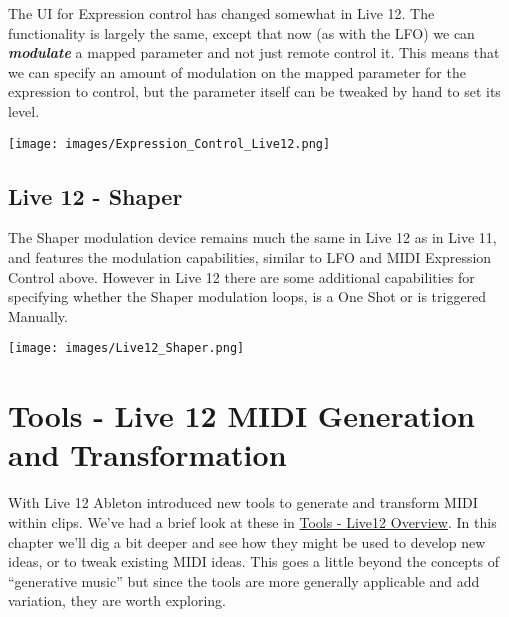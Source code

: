 \documentclass[
  12pt,
  letterpaper,
  oneside,
  open=any]{scrbook}
\begin{document}
The UI for Expression control has changed somewhat in Live 12. The
functionality is largely the same, except that now (as with the LFO) we
can \textbf{\emph{modulate}} a mapped parameter and not just remote
control it. This means that we can specify an amount of modulation on
the mapped parameter for the expression to control, but the parameter
itself can be tweaked by hand to set its level.

\texttt{[image: images/Expression\_Control\_Live12.png]}

\section{Live 12 - Shaper}\label{live-12---shaper}

The Shaper modulation device remains much the same in Live 12 as in Live
11, and features the modulation capabilities, similar to LFO and MIDI
Expression Control above. However in Live 12 there are some additional
capabilities for specifying whether the Shaper modulation loops, is a
One Shot or is triggered Manually.

\texttt{[image: images/Live12\_Shaper.png]}


\chapter{Tools - Live 12 MIDI Generation and
Transformation}\label{Chapter-033-Tools-Live12_MIDI_Generation_Transformation}

With Live 12 Ableton introduced new tools to generate and transform MIDI
within clips. We've had a brief look at these in
\hyperref[Chapter-030-Tools-Live12_Intro]{Tools - Live12 Overview}. In
this chapter we'll dig a bit deeper and see how they might be used to
develop new ideas, or to tweak existing MIDI ideas. This goes a little
beyond the concepts of ``generative music'' but since the tools are more
generally applicable and add variation, they are worth exploring.
\end{document}
